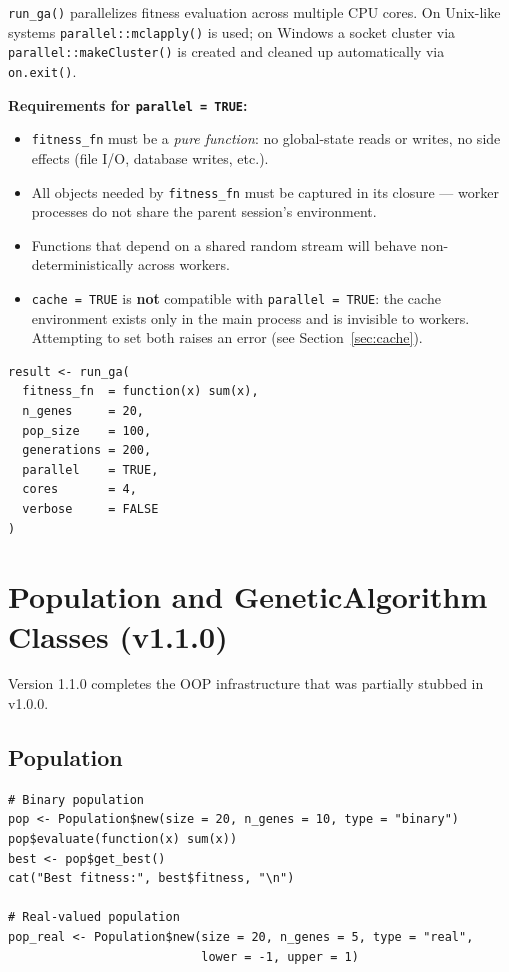 \documentclass[11pt,a4paper]{article}
\begin{document}
\texttt{run\_ga()} parallelizes fitness evaluation across multiple CPU cores.
On Unix-like systems \texttt{parallel::mclapply()} is used; on Windows a
socket cluster via \texttt{parallel::makeCluster()} is created and cleaned up
automatically via \texttt{on.exit()}.

\textbf{Requirements for \texttt{parallel = TRUE}:}
\begin{itemize}
  \item \texttt{fitness\_fn} must be a \emph{pure function}: no global-state
    reads or writes, no side effects (file I/O, database writes, etc.).
  \item All objects needed by \texttt{fitness\_fn} must be captured in its
    closure --- worker processes do not share the parent session's
    environment.
  \item Functions that depend on a shared random stream will behave
    non-deterministically across workers.
  \item \texttt{cache = TRUE} is \textbf{not} compatible with
    \texttt{parallel = TRUE}: the cache environment exists only in the main
    process and is invisible to workers.  Attempting to set both raises an
    error (see Section~\ref{sec:cache}).
\end{itemize}

\begin{lstlisting}
result <- run_ga(
  fitness_fn  = function(x) sum(x),
  n_genes     = 20,
  pop_size    = 100,
  generations = 200,
  parallel    = TRUE,
  cores       = 4,
  verbose     = FALSE
)
\end{lstlisting}

\section{Population and GeneticAlgorithm Classes (v1.1.0)}

Version 1.1.0 completes the OOP infrastructure that was partially stubbed in
v1.0.0.

\subsection{Population}

\begin{lstlisting}
# Binary population
pop <- Population$new(size = 20, n_genes = 10, type = "binary")
pop$evaluate(function(x) sum(x))
best <- pop$get_best()
cat("Best fitness:", best$fitness, "\n")

# Real-valued population
pop_real <- Population$new(size = 20, n_genes = 5, type = "real",
                           lower = -1, upper = 1)
\end{lstlisting}
\end{document}
